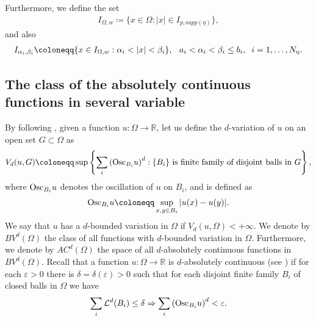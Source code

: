 \documentclass[11pt,leqno]{amsart}
\theoremstyle{remark}
\theoremstyle{definition}
\theoremstyle{definition}
\begin{document}
Furthermore, we define the set
\begin{align}\label{Iomega}
I_{\Omega,w}\coloneqq \{x\in \Omega: \vert x\vert \in I_{p,{\mathrm supp}(\eta)}\},
\end{align}
and also
\begin{align}
\label{newset}
I_{\alpha_{i},\beta_{i}}\coloneqq \{x\in I_{\Omega,w}: \alpha_{i}<\vert x\vert< \beta_{i}\}, \hskip 0,2cm\, a_{i}<\alpha_{i}<\beta_{i}\leq b_{i}, \hskip 0,2cm i=1,\ldots, N_{\eta}.
\end{align}
\subsection{The class of the absolutely continuous functions in several variable}
By following \cite{Mal}, given a function $u:\Omega\rightarrow \mathbb{R}$, let us define the $d$-variation of $u$ on an open set $G\subset \Omega$ as
\begin{align}
V_{d}(u,G)\coloneqq \sup\left\{\sum_{i}\left({\rm Osc}_{B_{i}}u\right)^{d}: \text{$\{B_{i}\}$ is finite family of disjoint balls in $G$}\right\},
\end{align}
where ${\rm Osc}_{B_{i}}u$ denotes the oscillation of $u$ on $B_{i}$, and is defined as
\begin{align*}
{\rm Osc}_{B_{i}}u\coloneqq \sup_{x,y\in B_{i}}\vert u(x)-u(y) \vert.
\end{align*}
We say that $u$ has a $d$-bounded variation in $\Omega$ if $V_{d}(u,\Omega)<+\infty$. We denote by $BV^{d}(\Omega)$ the class of all functions with $d$-bounded variation in $\Omega$. Furthermore, we denote by $AC^{d}(\Omega)$ the space of all $d$-absolutely continuous functions in $BV^{d}(\Omega)$. Recall that a function $u:\Omega\rightarrow \mathbb{R}$ is $d$-absolutely continuous (see \cite[Page 2]{Mal}) if for each $\varepsilon>0$ there is $\delta=\delta(\varepsilon)>0$ such that for each disjoint finite family ${B_{i}}$ of closed balls in $\Omega$ we have
\begin{align*}
\sum_{i}\mathcal{L}^{d}(B_{i})\leq \delta \Rightarrow \sum_{i}\left({\displaystyle{\rm Osc}}_{B_{i}}u\right)^{d}<\varepsilon.
\end{align*} 
\end{document}
